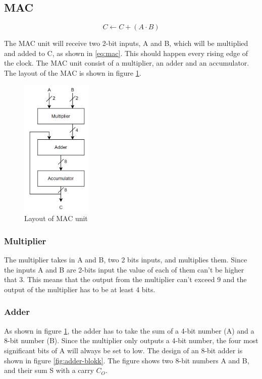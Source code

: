 \subsection{MAC}
\label{subsec:MAC_theory}

\begin{equation}
    \label{eq:mac}
    C \leftarrow C + (A \cdot B)
\end{equation}

The MAC unit will receive two 2-bit inputs, A and B, which will be multiplied and added to C, as shown in \ref{eq:mac}. This should happen every rising edge of the clock. The MAC unit consist of a multiplier, an adder and an accumulator. The layout of the MAC is shown in figure \ref{fig:mac-blokk}. 

\begin{figure}[htpb]
    \centering
    \includegraphics[width=0.3\textwidth]{Figures/mac-blokk.png}
    \caption{Layout of MAC unit}
    \label{fig:mac-blokk}
\end{figure}

\subsubsection{Multiplier}
The multiplier takes in A and B, two 2 bits inputs, and multiplies them. Since the inputs A and B are 2-bits input the value of each of them can't be higher that 3. This means that the output from the multiplier can't exceed 9 and the output of the multiplier has to be at least 4 bits. 

\subsubsection{Adder}
As shown in figure \ref{fig:mac-blokk}, the adder has to take the sum of a 4-bit number (A) and a 8-bit number (B). Since the multiplier only outputs a 4-bit number, the four most significant bits of A will always be set to low. The design of an 8-bit adder is shown in figure \ref{fig:adder-blokk}. The figure shows two 8-bit numbers A and B, and their sum S with a carry $C_O$. 


